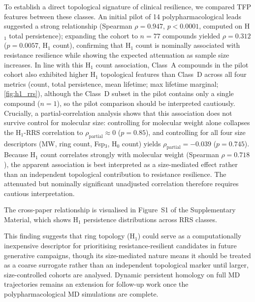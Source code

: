 \documentclass[11pt,a4paper]{article}
\begin{document}
To establish a direct topological signature of clinical resilience, we compared TFP features between these classes. An initial pilot of 14 polypharmacological leads suggested a strong relationship (Spearman $\rho = 0.947$, $p < 0.0001$, computed on H$_1$ total persistence); expanding the cohort to $n = 77$ compounds yielded $\rho = 0.312$ ($p = 0.0057$, H$_1$ count), confirming that H$_1$ count is nominally associated with resistance resilience while showing the expected attenuation as sample size increases. In line with this H$_1$ count association, Class~A compounds in the pilot cohort also exhibited higher H$_1$ topological features than Class~D across all four metrics (count, total persistence, mean lifetime; max lifetime marginal; \cref{fig:h1_rrs}), although the Class~D subset in the pilot contains only a single compound ($n = 1$), so the pilot comparison should be interpreted cautiously. Crucially, a partial-correlation analysis shows that this association does not survive control for molecular size: controlling for molecular weight alone collapses the H$_1$-RRS correlation to $\rho_{\text{partial}} \approx 0$ ($p = 0.85$), and controlling for all four size descriptors (MW, ring count, Fsp$_3$, H$_0$ count) yields $\rho_{\text{partial}} = -0.039$ ($p = 0.745$). Because H$_1$ count correlates strongly with molecular weight (Spearman $\rho = 0.718$), the apparent association is best interpreted as a size-mediated effect rather than an independent topological contribution to resistance resilience. The attenuated but nominally significant unadjusted correlation therefore requires cautious interpretation.

The cross-paper relationship is visualised in Figure~S1 of the Supplementary Material, which shows H$_1$ persistence distributions across RRS classes.

This finding suggests that ring topology (H$_1$) could serve as a computationally inexpensive descriptor for prioritising resistance-resilient candidates in future generative campaigns, though its size-mediated nature means it should be treated as a coarse surrogate rather than an independent topological marker until larger, size-controlled cohorts are analysed. Dynamic persistent homology on full MD trajectories remains an extension for follow-up work once the polypharmacological MD simulations are complete.

\end{document}
